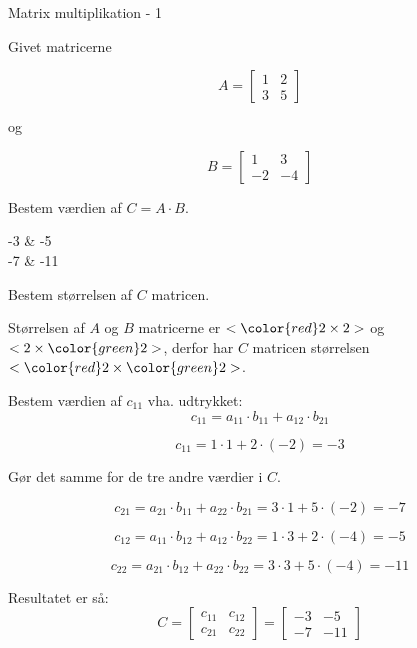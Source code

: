 \documentclass{article}
\begin{document}
\tableofcontents
\newpage

\begin{exercise}{Matrix multiplikation - 1}

Givet matricerne 

\[
A = \left[\begin{array}{rr}
1 & 2 \\ 
3 & 5 
\end{array} \right]
\]

og 

\[
B = \left[\begin{array}{rr}
1 & 3 \\ 
-2 & -4 
\end{array} \right]
\]

Bestem værdien af $C = A \cdot B$.

\begin{answermatrix}
-3 & -5  \\
-7 & -11 
\end{answermatrix}

\hint
Bestem størrelsen af $C$ matricen.

\hint
Størrelsen af $A$ og $B$ matricerne er $<{\color{red} 2} \times 2>$ og $<2 \times {\color{green}2}>$, 
derfor har $C$ matricen størrelsen $<{\color{red} 2} \times {\color{green}2}>$.

\hint
Bestem værdien af $c_{11}$ vha. udtrykket:
\[
c_{11} = a_{11} \cdot b_{11} + a_{12} \cdot b_{21}
\]

\hint
\[
c_{11} = 1 \cdot 1 + 2 \cdot (-2) = -3
\]

\hint
Gør det samme for de tre andre værdier i $C$.

\hint
\[
c_{21} = a_{21} \cdot b_{11} + a_{22} \cdot b_{21} = 3 \cdot 1 + 5 \cdot (-2) = -7
\]

\hint
\[
c_{12} = a_{11} \cdot b_{12} + a_{12} \cdot b_{22} = 1 \cdot 3 + 2 \cdot (-4) = -5
\]

\hint
\[
c_{22} = a_{21} \cdot b_{12} + a_{22} \cdot b_{22} = 3 \cdot 3 + 5 \cdot (-4) = -11
\]


\hint
Resultatet er så:
\[
C = \left[\begin{array}{rr}
c_{11} & c_{12} \\
c_{21} & c_{22} 
\end{array} \right] = 
\left[\begin{array}{rr}
-3 & -5 \\
-7 & -11 
\end{array} \right]
\]


\end{exercise}
\end{document}

